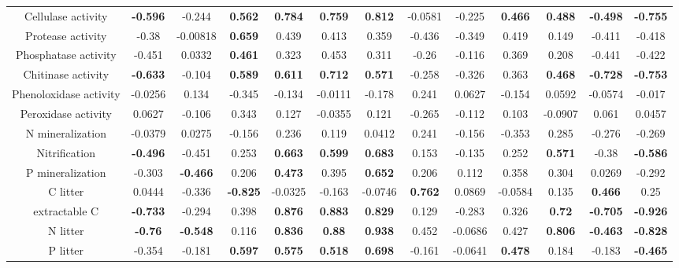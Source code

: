 \documentclass[authoryear,preprint,review,12pt]{elsarticle}
\begin{document}
\begin{landscape}
\begin{table}[h!]
\begin{center}
{\begin{tabular}{ccccccccccccc}
  Cellulase activity & \textbf{ -0.596 } & -0.244 & \textbf{ 0.562 } & \textbf{ 0.784 } & \textbf{ 0.759 } & \textbf{ 0.812 } & -0.0581 & -0.225 & \textbf{ 0.466 } & \textbf{ 0.488 } & \textbf{ -0.498 } & \textbf{ -0.755 } \\ 
  Protease activity & -0.38 & -0.00818 & \textbf{ 0.659 } & 0.439 & 0.413 & 0.359 & -0.436 & -0.349 & 0.419 & 0.149 & -0.411 & -0.418 \\ 
  Phosphatase activity & -0.451 & 0.0332 & \textbf{ 0.461 } & 0.323 & 0.453 & 0.311 & -0.26 & -0.116 & 0.369 & 0.208 & -0.441 & -0.422 \\ 
  Chitinase activity & \textbf{ -0.633 } & -0.104 & \textbf{ 0.589 } & \textbf{ 0.611 } & \textbf{ 0.712 } & \textbf{ 0.571 } & -0.258 & -0.326 & 0.363 & \textbf{ 0.468 } & \textbf{ -0.728 } & \textbf{ -0.753 } \\ 
  Phenoloxidase activity & -0.0256 & 0.134 & -0.345 & -0.134 & -0.0111 & -0.178 & 0.241 & 0.0627 & -0.154 & 0.0592 & -0.0574 & -0.017 \\ 
  Peroxidase activity & 0.0627 & -0.106 & 0.343 & 0.127 & -0.0355 & 0.121 & -0.265 & -0.112 & 0.103 & -0.0907 & 0.061 & 0.0457 \\ 
  N mineralization & -0.0379 & 0.0275 & -0.156 & 0.236 & 0.119 & 0.0412 & 0.241 & -0.156 & -0.353 & 0.285 & -0.276 & -0.269 \\ 
  Nitrification & \textbf{ -0.496 } & -0.451 & 0.253 & \textbf{ 0.663 } & \textbf{ 0.599 } & \textbf{ 0.683 } & 0.153 & -0.135 & 0.252 & \textbf{ 0.571 } & -0.38 & \textbf{ -0.586 } \\ 
  P mineralization & -0.303 & \textbf{ -0.466 } & 0.206 & \textbf{ 0.473 } & 0.395 & \textbf{ 0.652 } & 0.206 & 0.112 & 0.358 & 0.304 & 0.0269 & -0.292 \\ 
  C litter & 0.0444 & -0.336 & \textbf{ -0.825 } & -0.0325 & -0.163 & -0.0746 & \textbf{ 0.762 } & 0.0869 & -0.0584 & 0.135 & \textbf{ 0.466 } & 0.25 \\ 
  extractable C & \textbf{ -0.733 } & -0.294 & 0.398 & \textbf{ 0.876 } & \textbf{ 0.883 } & \textbf{ 0.829 } & 0.129 & -0.283 & 0.326 & \textbf{ 0.72 } & \textbf{ -0.705 } & \textbf{ -0.926 } \\ 
  N litter & \textbf{ -0.76 } & \textbf{ -0.548 } & 0.116 & \textbf{ 0.836 } & \textbf{ 0.88 } & \textbf{ 0.938 } & 0.452 & -0.0686 & 0.427 & \textbf{ 0.806 } & \textbf{ -0.463 } & \textbf{ -0.828 } \\ 
  P litter & -0.354 & -0.181 & \textbf{ 0.597 } & \textbf{ 0.575 } & \textbf{ 0.518 } & \textbf{ 0.698 } & -0.161 & -0.0641 & \textbf{ 0.478 } & 0.184 & -0.183 & \textbf{ -0.465 } \\ 

\end{tabular}}
\end{center}
\end{table}
\end{landscape}
\end{document}
